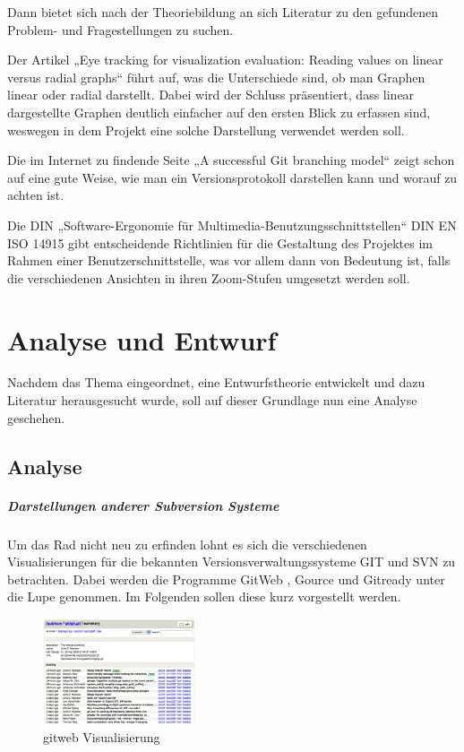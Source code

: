 \documentclass[color, ddc]{tudscrreprt}
\begin{document}
Dann bietet sich nach der Theoriebildung an sich Literatur zu den gefundenen Problem- und Fragestellungen zu suchen.

Der Artikel „Eye tracking for visualization evaluation: Reading values on linear versus radial graphs“ \cite{goldberg:visualization-evaluation} führt auf, was die Unterschiede sind, ob man Graphen linear oder radial darstellt. Dabei wird der Schluss präsentiert, dass linear dargestellte Graphen deutlich einfacher auf den ersten Blick zu erfassen sind, weswegen in dem Projekt eine solche Darstellung verwendet werden soll.

Die im Internet zu findende Seite „A successful Git branching model“ \cite{driessen:branching-model} zeigt schon auf eine gute Weise, wie man ein Versionsprotokoll darstellen kann und worauf zu achten ist.

Die DIN „Software-Ergonomie für Multimedia-Benutzungsschnittstellen“ DIN EN ISO 14915 \cite{DIN:EN-ISO-14915-1} \cite{DIN:EN-ISO-14915-2} \cite{DIN:EN-ISO-14915-3} gibt entscheidende Richtlinien für die Gestaltung des Projektes im Rahmen einer Benutzerschnittstelle, was vor allem dann von Bedeutung ist, falls die verschiedenen Ansichten in ihren Zoom-Stufen umgesetzt werden soll.
    
\chapter{Analyse und Entwurf}

Nachdem das Thema eingeordnet, eine Entwurfstheorie entwickelt und dazu Literatur herausgesucht wurde, soll auf dieser Grundlage nun eine Analyse geschehen.

\section{Analyse}

\paragraph{Darstellungen anderer Subversion Systeme} Um das Rad nicht neu zu erfinden lohnt es sich die verschiedenen Visualisierungen für die bekannten Versionsverwaltungssysteme GIT und SVN zu betrachten. Dabei werden die Programme GitWeb \cite{url:git}, Gource \cite{url:svn-gource} und Gitready \cite{url:gitready} unter die Lupe genommen. Im Folgenden sollen diese kurz vorgestellt werden.
\begin{figure}[ht!]
\centering
\includegraphics[width=0.4\textwidth]{Skizzen/gitweb.png}
\caption{gitweb Visualisierung}
\label{gitweb-img}
\end{figure}
\end{document}
